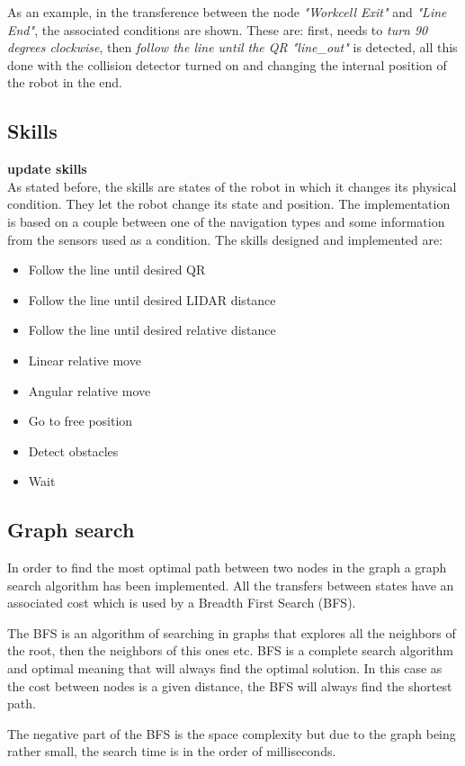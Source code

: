     As an example, in the transference between the node \emph{"Workcell Exit"} and \emph{"Line End"}, the associated conditions are shown. 
    These are: first, needs to \emph{turn 90 degrees clockwise}, then \emph{follow the line until the QR "line\_out"} is detected, all this done with the collision detector turned on and changing the internal position of the robot in the end.

    \subsection{Skills} %
    \label{sub:skills}
    \textbf{update skills}\\
    As stated before, the skills are states of the robot in which it changes its physical condition.
    They let the robot change its state and position.
    The implementation is based on a couple between one of the navigation types and some information from the sensors used as a condition.
    The skills designed and implemented are:
    \begin{itemize}
        \item Follow the line until desired QR
        \item Follow the line until desired LIDAR distance
        \item Follow the line until desired relative distance
        \item Linear relative move
        \item Angular relative move
        \item Go to free position
        \item Detect obstacles
        \item Wait
    \end{itemize}

    \subsection{Graph search} %
    \label{sub:mr_graph_search}
    In order to find the most optimal path between two nodes in the graph a graph search algorithm has been implemented.
    All the transfers between states have an associated cost which is used by a Breadth First Search (BFS).

    The BFS is an algorithm of searching in graphs that explores all the neighbors of the root, then the neighbors of this ones etc.
    BFS is a complete search algorithm and optimal meaning that will always find the optimal solution.
    In this case as the cost between nodes is a given distance, the BFS will always find the shortest path.
    
    The negative part of the BFS is the space complexity but due to the graph being rather small, the search time is in the order of milliseconds.

